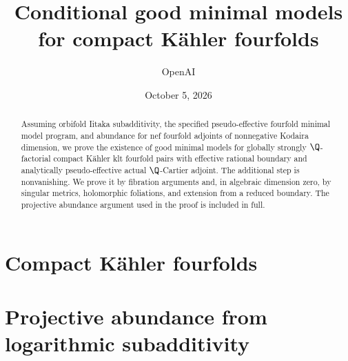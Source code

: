 \documentclass[11pt,letterpaper]{article}
\title{Conditional good minimal models\\for compact K\"ahler fourfolds}
\author{OpenAI}
\date{October 5, 2026}
\begin{document}
\maketitle
\begin{abstract}
Assuming orbifold Iitaka subadditivity, the specified pseudo-effective
fourfold minimal model program, and abundance for nef fourfold adjoints
of nonnegative Kodaira dimension, we prove the existence of good minimal
models for globally strongly \(\Q\)-factorial compact K\"ahler klt
fourfold pairs with effective rational boundary and analytically
pseudo-effective actual \(\Q\)-Cartier adjoint. The additional step
is nonvanishing. We prove it by
fibration arguments and, in algebraic dimension zero, by singular
metrics, holomorphic foliations, and extension from a reduced boundary.
The projective abundance argument used in the proof is included in full.
\end{abstract}
\tableofcontents
\newpage
\part{Compact K\"ahler fourfolds}









\clearpage
\appendix
\part{Projective abundance from logarithmic subadditivity}









\clearpage
{}
{}


\end{document}
